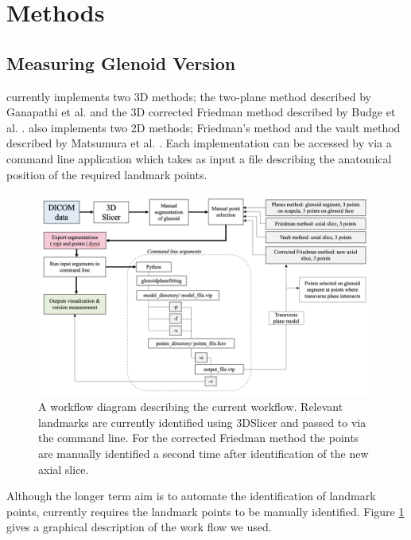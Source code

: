 \section{Methods}
\subsection{Measuring Glenoid Version}
\label{sec:methods}
\sksglenoid currently implements two 3D methods; the two-plane method described by Ganapathi et al. \cite{PMID:20933439} and the 3D corrected 
Friedman method described by Budge et al. \cite{BUDGE2011577}. \sksglenoid also implements two
2D methods; Friedman's method \cite{PMID:1522089} and the vault method described by Matsumura et al. \cite{PMID:24618285}. Each implementation can be accessed by via a command line application which takes as 
input a file describing the anatomical position of the required landmark points.

\begin{figure}
        \begin{center}
                \includegraphics[width=0.98\linewidth]{figures/workflow.png}
                        \caption{\label{fig:workflow}A workflow diagram describing the current workflow. Relevant landmarks 
			are currently identified using 3DSlicer and passed to \sksglenoid via the command line. For the corrected Friedman method the points are manually identified 
			a second time after identification of the new axial slice.}
        \end{center}
\end{figure}

Although the longer term aim is to automate the identification of landmark points, \sksglenoid currently requires the landmark points to be manually identified. 
Figure \ref{fig:workflow} gives a graphical description of the work flow we used. 

